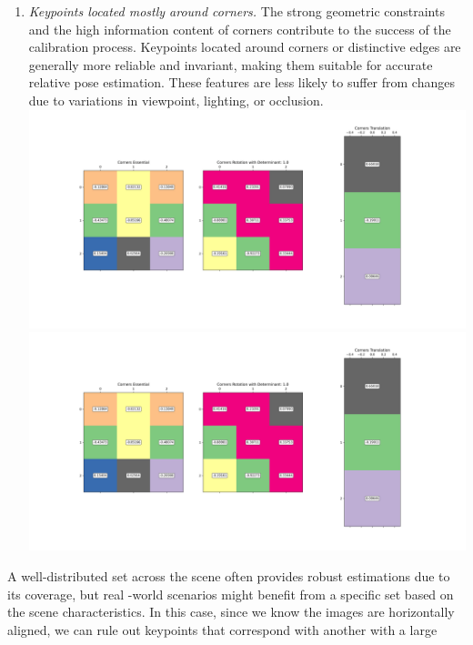 \documentclass[11pt]{article}
\begin{document}
\begin{itemize}
\begin{enumerate}
            \item \textit{Keypoints located mostly around corners.}\newline
            The strong geometric constraints and the high information content of corners contribute to the success of
            the calibration process. Keypoints located around corners or distinctive edges are generally more
            reliable and invariant, making them suitable for accurate relative pose estimation. These features are
            less likely to suffer from changes due to variations in viewpoint, lighting, or occlusion.\newline
            \includegraphics[width=\textwidth]{Output Pictures/Corners Lines}\newline
            \includegraphics[width=\textwidth]{Output Pictures/Corners Matrices}\newline
        \end{enumerate}
        A well-distributed set across the scene often provides robust estimations due to its coverage, but real
        -world scenarios might benefit from a specific set based on the scene characteristics. In this case, since we
        know the images are horizontally aligned, we can rule out keypoints that correspond with another with a large

\end{itemize}
\end{document}
